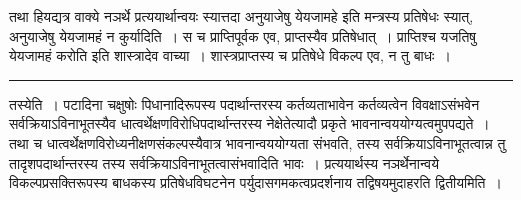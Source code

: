 \documentclass[11pt, openany]{book}
\begin{document}
{\bl तथा हि\textendash यद्यत्र वाक्ये नञर्थे प्रत्ययार्थान्वयः स्यात्तदा अनुयाजेषु {\qtl येयजामहे} इति मन्त्रस्य प्रतिषेधः स्यात्, अनुयाजेषु येयजामहं न कुर्यादिति~। स च प्राप्तिपूर्वक एव, प्राप्तस्यैव प्रतिषेधात्~। प्राप्तिश्च {\qtl यजतिषु येयजामहं करोति}  इति शास्त्रादेव  वाच्या~। शास्त्रप्राप्तस्य च प्रतिषेधे विकल्प एव, न तु बाधः~।}\\
\hrule
\vspace{3mm}
\noindent
{\br तस्येति~।} पटादिना चक्षुषोः पिधानादिरूपस्य पदार्थान्तरस्य कर्तव्यताभावेन  कर्तव्यत्वेन विवक्षाऽसंभवेन सर्वक्रियाऽविनाभूतस्यैव धात्वर्थेक्षणविरोधिपदार्थान्तरस्य 
नेक्षेतेत्यादौ प्रकृते भावनान्वययोग्यत्वमुपपद्यते~। तथा च धात्वर्थेक्षणविरोध्यनीक्षणसंकल्पस्यैवात्र भावनान्वययोग्यता संभवति, तस्य सर्वक्रियाऽविनाभूतत्वान्न तु 
तादृशपदार्थान्तरस्य तस्य सर्वक्रियाऽविनाभूतत्वासंभवादिति भावः~। प्रत्ययार्थस्य नञर्थेनान्वये विकल्पप्रसक्तिरूपस्य बाधकस्य प्रतिषेधविघटनेन पर्युदासगमकत्वप्रदर्शनाय तद्विषयमुदाहरति {\br द्वितीयमिति~।} \\
\end{document}
